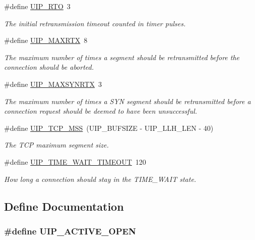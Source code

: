 \begin{CompactItemize}
\#define \hyperlink{a00074_g15de27b044603284f68db05a378235a7}{UIP\_\-RTO}~3
\begin{CompactList}\small\item\em The initial retransmission timeout counted in timer pulses. \item\end{CompactList}\item 
\#define \hyperlink{a00074_g67cf1e0d2324c93f332c1f020c0fe8b3}{UIP\_\-MAXRTX}~8
\begin{CompactList}\small\item\em The maximum number of times a segment should be retransmitted before the connection should be aborted. \item\end{CompactList}\item 
\#define \hyperlink{a00074_g24aa5bc36939cc9a0833e1df01478a7e}{UIP\_\-MAXSYNRTX}~3
\begin{CompactList}\small\item\em The maximum number of times a SYN segment should be retransmitted before a connection request should be deemed to have been unsuccessful. \item\end{CompactList}\item 
\#define \hyperlink{a00074_g4910467b83a639f06739c82cd362037e}{UIP\_\-TCP\_\-MSS}~(UIP\_\-BUFSIZE - UIP\_\-LLH\_\-LEN - 40)
\begin{CompactList}\small\item\em The TCP maximum segment size. \item\end{CompactList}\item 
\#define \hyperlink{a00074_g2bc3b489923793759526a3181eb667fa}{UIP\_\-TIME\_\-WAIT\_\-TIMEOUT}~120
\begin{CompactList}\small\item\em How long a connection should stay in the TIME\_\-WAIT state. \item\end{CompactList}\end{CompactItemize}


\subsection{Define Documentation}
\hypertarget{a00074_gac0de06236b02659460445de30776e00}{
\subsubsection[UIP\_\-ACTIVE\_\-OPEN]{\setlength{\rightskip}{0pt plus 5cm}\#define UIP\_\-ACTIVE\_\-OPEN}}
\label{a00074_gac0de06236b02659460445de30776e00}


